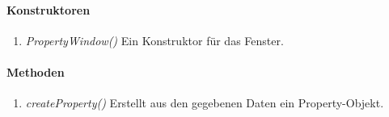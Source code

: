 \paragraph{Konstruktoren}
\begin{enumerate}[+]
	\item \textit{PropertyWindow()} Ein Konstruktor für das Fenster.
\end{enumerate}

\paragraph{Methoden}

\begin{enumerate}[+]
	\item \textit{createProperty()} Erstellt aus den gegebenen Daten ein 	Property-Objekt.	
\end{enumerate}

